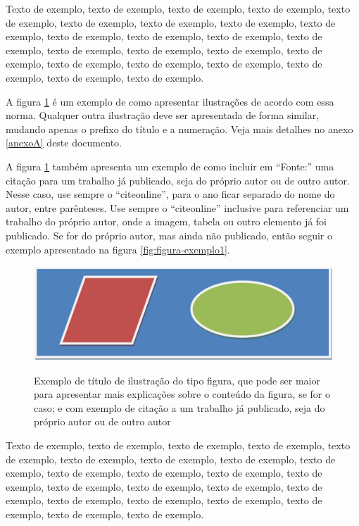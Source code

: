 \documentclass[
	12pt,				%
	oneside,			%
	a4paper,			%
	english,			%
	brazil				%
	]{abntex2ppgsi}
\begin{document}
Texto de exemplo, texto de exemplo, texto de exemplo, texto de exemplo, texto de exemplo, texto de exemplo, texto de exemplo, texto de exemplo, texto de exemplo, texto de exemplo, texto de exemplo, texto de exemplo, texto de exemplo, texto de exemplo, texto de exemplo, texto de exemplo, texto de exemplo, texto de exemplo, texto de exemplo, texto de exemplo, texto de exemplo, texto de exemplo, texto de exemplo.

A figura \ref{fig:figura-exemplo2} é um exemplo de como apresentar ilustrações de acordo com essa norma. Qualquer outra ilustração deve ser apresentada de forma similar, mudando apenas o prefixo do título e a numeração. Veja mais detalhes no anexo \ref{anexoA} deste documento.

A figura \ref{fig:figura-exemplo2} também apresenta um exemplo de como incluir em ``Fonte:'' uma citação para um trabalho já publicado, seja do próprio autor ou de outro autor. Nesse caso, use sempre o ``citeonline'', para o ano ficar separado do nome do autor, entre parênteses. Use sempre o ``citeonline'' inclusive para referenciar um trabalho do próprio autor, onde a imagem, tabela ou outro elemento já foi publicado. Se for do próprio autor, mas ainda não publicado, então seguir o exemplo apresentado na figura \ref{fig:figura-exemplo1}.

\begin{figure}[htbp]
	\centering
  \caption{Exemplo de título de ilustração do tipo figura, que pode ser maior para apresentar mais explicações sobre o conteúdo da figura, se for o caso; e com exemplo de citação a um trabalho já publicado, seja do próprio autor ou de outro autor}
		\includegraphics{figura-exemplo.png}
	\label{fig:figura-exemplo2}
\end{figure}

Texto de exemplo, texto de exemplo, texto de exemplo, texto de exemplo, texto de exemplo, texto de exemplo, texto de exemplo, texto de exemplo, texto de exemplo, texto de exemplo, texto de exemplo, texto de exemplo, texto de exemplo, texto de exemplo, texto de exemplo, texto de exemplo, texto de exemplo, texto de exemplo, texto de exemplo, texto de exemplo, texto de exemplo, texto de exemplo, texto de exemplo.
\end{document}
